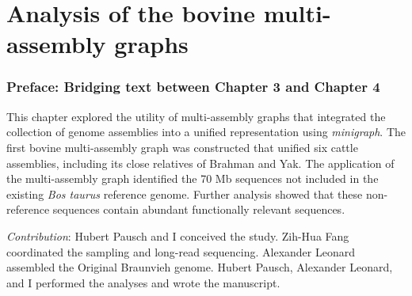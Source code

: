 \documentclass[11 pt, a4paper, notitlepage]{report}
\begin{document}


\chapter[Bovine multi-assembly graphs]{\LARGE{Analysis of the bovine multi-assembly graphs}}
\label{chap:multigraph}

\subsection*{Preface: Bridging text between Chapter 3 and Chapter 4}

\normalsize
This chapter explored the utility of multi-assembly graphs that integrated the collection of genome assemblies into a unified representation using \emph{minigraph}. The first bovine multi-assembly graph was constructed that unified six cattle assemblies, including its close relatives of Brahman and Yak. The application of the multi-assembly graph identified the 70 Mb sequences not included in the existing \emph{Bos taurus} reference genome. Further analysis showed that these non-reference sequences contain abundant functionally relevant sequences. \\

\bigskip


\emph{Contribution}: Hubert Pausch and I conceived the study. Zih-Hua Fang coordinated the sampling and long-read sequencing. Alexander Leonard assembled the Original Braunvieh genome. Hubert Pausch, Alexander Leonard, and I performed the analyses and wrote the manuscript. 

\onehalfspacing



\chapter*{}
\singlespacing
{}


\chapter*{}
\singlespacing
{}


\chapter*{}
\singlespacing
{}



\newif\ifincludecv
\includecvtrue %
\ifincludecv
    \newpage
    
\fi
\end{document}
